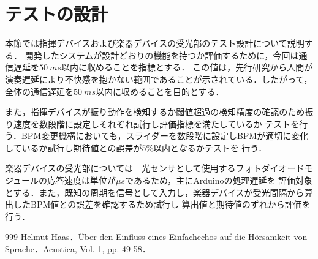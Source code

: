 \documentclass[lualatex,book,paper=a4paper,jafontsize=11.5pt,jafontscale=1.05,openany]{jlreq}
\begin{document}






\newpage
\section{テストの設計}

本節では指揮デバイスおよび楽器デバイスの受光部のテスト設計について説明する．
開発したシステムが設計どおりの機能を持つか評価するために，今回は通信遅延を$\SI{50}{ms}$以内に収めることを指標とする．
この値は，先行研究から人間が演奏遅延により不快感を抱かない範囲であることが示されている\cite{ref:tien}．したがって，
全体の通信遅延を$\SI{50}{ms}$以内に収めることを目的とする．

また，指揮デバイスが振り動作を検知するか閾値超過の検知精度の確認のため振り速度を数段階に設定しそれぞれ試行し評価指標を満たしているか
テストを行う．BPM変更機構においても，スライダーを数段階に設定しBPMが適切に変化しているか試行し期待値との誤差が5\%以内となるかテストを
行う．\par

楽器デバイスの受光部については　光センサとして使用するフォトダイオードモジュールの応答速度は単位が$\si{μs}$であるため，主にArduinoの処理遅延を
評価対象とする．また，既知の周期を信号として入力し，楽器デバイスが受光間隔から算出したBPM値との誤差を確認するため試行し
算出値と期待値のずれから評価を行う．



\begin{thebibliography}{999}
Helmut Haas．Über den Einfluss eines Einfachechos auf die Hörsamkeit von Sprache．Acustica, Vol. 1, pp. 49-58．

\end{thebibliography}
\end{document}
